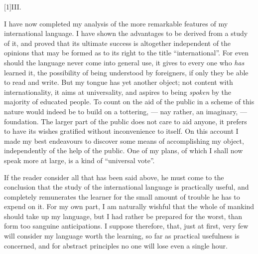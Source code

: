 \documentclass[12pt,twoside]{book}
\begin{document}
{}
\hspace*{\fill}\scalebox{2}[1]{\large\cowboyfont{}III.}\hspace*{\fill}

\vspace{12pt}
\nopagebreak
I have now completed my analysis of the more remarkable features of my international language. I have shown the advantages to be derived from a study of it, and proved that its ultimate success is altogether independent of the opinions that may be formed as to its right to the title “international”. For even should the language never come into general use, it gives to every one who \emph{has} learned it, the possibility of being understood by foreigners, if only they be able to read and write. But my tongue has yet another object; not content with internationality, it aims at universality, and aspires to being \emph{spoken} by the majority of educated people. To count on the aid of the public in a scheme of this nature would indeed be to build on a tottering, --- nay rather, an imaginary, --- foundation. The larger part of the public does not care to aid anyone, it prefers to have its wishes gratified without inconvenience to itself. On this account I made my best endeavours to discover some means of accomplishing my object, independently of the help of the public. One of my plans, of which I shall now speak more at large, is a kind of “universal vote”.

If the reader consider all that has been said above, he must come to the conclusion that the study of the international language is practically useful, and completely remunerates the learner for the small amount of trouble he has to expend on it. For my own part, I am naturally wishful that the whole of mankind should take up my language, but I had rather be prepared for the worst, than form too sanguine anticipations. I suppose therefore, that, just at first, very few will consider my language worth the learning, so far as practical usefulness is concerned, and for abstract principles no one will lose even a single hour.
\end{document}
